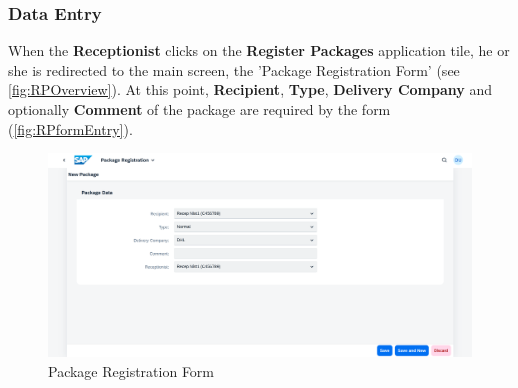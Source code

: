 \subsubsection{Data Entry}

When the \textbf{Receptionist} clicks on the \textbf{Register Packages} application tile, he or she is redirected to the main screen, the 'Package Registration Form' (see \autoref{fig:RPOverview}). At this point, \textbf{Recipient}, \textbf{Type}, \textbf{Delivery Company} and optionally \textbf{Comment} of the package are required by the form (\autoref{fig:RPformEntry}).

\begin{figure}[htb!]
	\centering
	\includegraphics[width=0.95\linewidth]{images/user_doc/registration/overview.png}
	\caption{Package Registration Form}
	\label{fig:RPOverview}
\end{figure}


